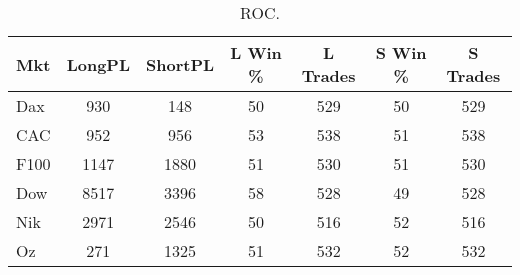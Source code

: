 \begin{table}[ht]
\centering
\caption[ROC]{ROC.} 
\label{tab:mac_roc_results}
\begin{tabular}{lcccccc}
  \toprule Mkt & LongPL & ShortPL & L Win \% & L Trades & S Win \% & S Trades \\ 
  \midrule Dax & 930 & 148 & 50 & 529 & 50 & 529 \\ 
  CAC & 952 & 956 & 53 & 538 & 51 & 538 \\ 
  F100 & 1147 & 1880 & 51 & 530 & 51 & 530 \\ 
  Dow & 8517 & 3396 & 58 & 528 & 49 & 528 \\ 
  Nik & 2971 & 2546 & 50 & 516 & 52 & 516 \\ 
  Oz & 271 & 1325 & 51 & 532 & 52 & 532 \\ 
   \bottomrule \end{tabular}
\end{table}
